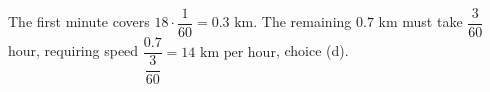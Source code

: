 The first minute covers $18\cdot\dfrac{1}{60}=0.3$ km. The remaining $0.7$ km must take $\dfrac{3}{60}$ hour, requiring speed $\dfrac{0.7}{\dfrac{3}{60}}=\boxed{14\text{ km per hour}}$, choice (d).
